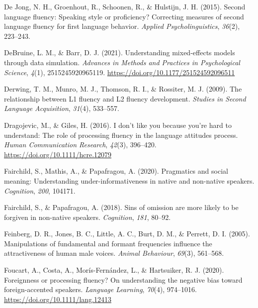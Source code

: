 \documentclass[
  man,floatsintext]{apa7}
\newlength{\cslhangindent}
\newlength{\cslentryspacingunit} %
\newenvironment{CSLReferences}[2] %
 {%
  \setlength{\parindent}{0pt}
  \ifodd #1
  \let\oldpar\par
  \def\par{\hangindent=\cslhangindent\oldpar}
  \fi
  \setlength{\parskip}{#2\cslentryspacingunit}
 }%
 {}
\begin{document}
\begin{CSLReferences}{1}{0}
\leavevmode{}%
De Jong, N. H., Groenhout, R., Schoonen, R., \& Hulstijn, J. H. (2015). Second language fluency: Speaking style or proficiency? Correcting measures of second language fluency for first language behavior. \emph{Applied Psycholinguistics}, \emph{36}(2), 223--243.

\leavevmode{}%
DeBruine, L. M., \& Barr, D. J. (2021). Understanding mixed-effects models through data simulation. \emph{Advances in Methods and Practices in Psychological Science}, \emph{4}(1), 2515245920965119. \url{https://doi.org/10.1177/251524592096511}

\leavevmode{}%
Derwing, T. M., Munro, M. J., Thomson, R. I., \& Rossiter, M. J. (2009). The relationship between L1 fluency and L2 fluency development. \emph{Studies in Second Language Acquisition}, \emph{31}(4), 533--557.

\leavevmode{}%
Dragojevic, M., \& Giles, H. (2016). I don't like you because you're hard to understand: The role of processing fluency in the language attitudes process. \emph{Human Communication Research}, \emph{42}(3), 396--420. \url{https://doi.org/10.1111/hcre.12079}

\leavevmode{}%
Fairchild, S., Mathis, A., \& Papafragou, A. (2020). Pragmatics and social meaning: Understanding under-informativeness in native and non-native speakers. \emph{Cognition}, \emph{200}, 104171.

\leavevmode{}%
Fairchild, S., \& Papafragou, A. (2018). Sins of omission are more likely to be forgiven in non-native speakers. \emph{Cognition}, \emph{181}, 80--92.

\leavevmode{}%
Feinberg, D. R., Jones, B. C., Little, A. C., Burt, D. M., \& Perrett, D. I. (2005). Manipulations of fundamental and formant frequencies influence the attractiveness of human male voices. \emph{Animal Behaviour}, \emph{69}(3), 561--568.

\leavevmode{}%
Foucart, A., Costa, A., Morís-Fernández, L., \& Hartsuiker, R. J. (2020). Foreignness or processing {fluency? On} understanding the negative bias toward foreign-accented speakers. \emph{Language Learning}, \emph{70}(4), 974--1016. \url{https://doi.org/10.1111/lang.12413}


\end{CSLReferences}
\end{document}
